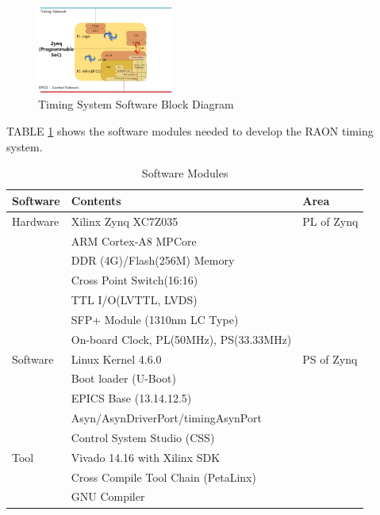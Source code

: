 \documentclass[journal,reqno]{IEEEtran}
\begin{document}
\begin{figure}[!htb]
	\centering
	\includegraphics*[width=0.4\textwidth, height=0.25\textwidth]{img24.png}
	\caption{Timing System Software Block Diagram}
	\label{timing_sw_block}
\end{figure}

TABLE \ref{sw-conf} shows the software modules needed to develop the RAON timing system.

\begin{table}[h!t]
	\centering
	\caption{Software Modules}
	\label{sw-conf}
	\begin{tabular}{@{}lll@{}}
		\hline
		\textbf{Software} & \textbf{Contents}  & \textbf{Area}     \\
		\hline
		Hardware			& Xilinx Zynq XC7Z035 & PL of Zynq     \\
					    	& ARM Cortex-A8 MPCore &               \\
							& DDR (4G)/Flash(256M) Memory &        \\         
							& Cross Point Switch(16:16) &          \\
							& TTL I/O(LVTTL, LVDS) &               \\         
							& SFP+ Module (1310nm LC Type) &       \\
							& On-board Clock, PL(50MHz), PS(33.33MHz)&\\
		
		\hline
		Software			& Linux Kernel 4.6.0	& PS of Zynq   \\
							& Boot loader (U-Boot)	&				\\
							& EPICS Base (13.14.12.5)	& 			\\        
							& Asyn/AsynDriverPort/timingAsynPort	&\\            
							& Control System Studio (CSS)			&\\
		\hline
		Tool	 			& Vivado 14.16 with Xilinx SDK 			&\\ 
							&  Cross Compile Tool Chain (PetaLinx)  & \\ 
							& GNU Compiler 							& \\               
		\hline
	\end{tabular}
\end{table}
\end{document}
